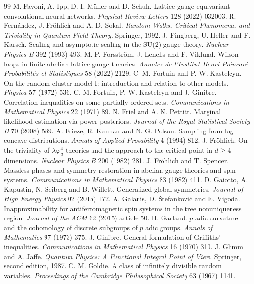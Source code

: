 \begin{thebibliography}{99}
 M. Favoni, A. Ipp, D. I. M\"uller and D. Schuh. Lattice gauge equivariant convolutional neural networks. \emph{Physical Review Letters} 128 (2022) 032003.
 R. Fern\'andez, J. Fr\"ohlich and A. D. Sokal. \emph{Random Walks, Critical Phenomena, and Triviality in Quantum Field Theory}. Springer, 1992.
 J. Fingberg, U. Heller and F. Karsch. Scaling and asymptotic scaling in the SU(2) gauge theory. \emph{Nuclear Physics B} 392 (1993) 493.
 M. P. Forsstr\"om, J. Lenells and F. Viklund. Wilson loops in finite abelian lattice gauge theories. \emph{Annales de l'Institut Henri Poincar\'e Probabilit\'es et Statistiques} 58 (2022) 2129.
 C. M. Fortuin and P. W. Kasteleyn. On the random cluster model I: introduction and relation to other models. \emph{Physica} 57 (1972) 536.
 C. M. Fortuin, P. W. Kasteleyn and J. Ginibre. Correlation inequalities on some partially ordered sets. \emph{Communications in Mathematical Physics} 22 (1971) 89.
 N. Friel and A. N. Pettitt. Marginal likelihood estimation via power posteriors. \emph{Journal of the Royal Statistical Society B} 70 (2008) 589.
 A. Frieze, R. Kannan and N. G. Polson. Sampling from log concave distributions. \emph{Annals of Applied Probability} 4 (1994) 812.
 J. Fr\"ohlich. On the triviality of $\lambda\varphi^4_d$ theories and the approach to the critical point in $d \ge 4$ dimensions. \emph{Nuclear Physics B} 200 (1982) 281.
 J. Fr\"ohlich and T. Spencer. Massless phases and symmetry restoration in abelian gauge theories and spin systems. \emph{Communications in Mathematical Physics} 83 (1982) 411.
 D. Gaiotto, A. Kapustin, N. Seiberg and B. Willett. Generalized global symmetries. \emph{Journal of High Energy Physics} 02 (2015) 172.
 A. Galanis, D. \v{S}tefankovi\v{c} and E. Vigoda. Inapproximability for antiferromagnetic spin systems in the tree nonuniqueness region. \emph{Journal of the ACM} 62 (2015) article 50.
 H. Garland. $p$ adic curvature and the cohomology of discrete subgroups of $p$ adic groups. \emph{Annals of Mathematics} 97 (1973) 375.
 J. Ginibre. General formulation of Griffiths' inequalities. \emph{Communications in Mathematical Physics} 16 (1970) 310.
 J. Glimm and A. Jaffe. \emph{Quantum Physics: A Functional Integral Point of View}. Springer, second edition, 1987.
 C. M. Goldie. A class of infinitely divisible random variables. \emph{Proceedings of the Cambridge Philosophical Society} 63 (1967) 1141.

\end{thebibliography}
